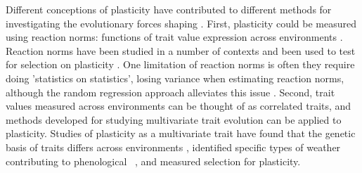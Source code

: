 Different conceptions of plasticity have contributed to different methods for investigating the evolutionary forces shaping \gxe.
First, plasticity could be measured using reaction norms: functions of trait value expression across environments \citep{freeman1973statistical,scheiner1993genetics, morrissey2016variation, arnold2019analyse, de2025partitioning}.
Reaction norms have been studied in a number of contexts and been used to test for selection on plasticity \citep{valdes2023spring, wagner2018plasticity}.
One limitation of reaction norms is often they require doing 'statistics on statistics', losing variance when estimating reaction norms, although the random regression approach alleviates this issue \citep{arnold2019analyse}.
Second, trait values measured across environments can be thought of as correlated traits, and methods developed for studying multivariate trait evolution can be applied to plasticity.
Studies of plasticity as a multivariate trait have found that the genetic basis of traits differs across environments \citep{yan2021genetic}, identified specific types of weather contributing to phenological \gxe\ \citep{MacQueen_2025}, and measured selection for plasticity\citep {anderson2021selection}.